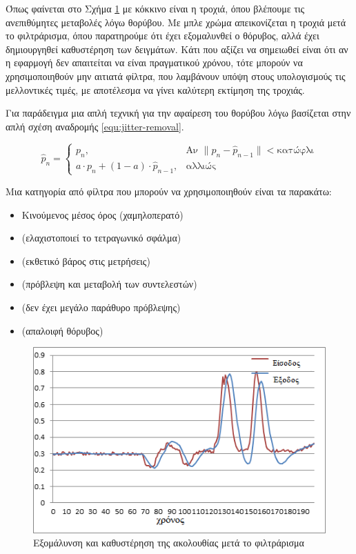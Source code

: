 Όπως φαίνεται στο Σχήμα \ref{fig:filter-latency} με κόκκινο είναι η τροχιά, όπου βλέπουμε τις ανεπιθύμητες μεταβολές λόγω θορύβου. Με μπλε χρώμα απεικονίζεται η τροχιά μετά το φιλτράρισμα, όπου παρατηρούμε ότι έχει εξομαλυνθεί ο θόρυβος, αλλά έχει δημιουργηθεί καθυστέρηση των δειγμάτων. Κάτι που αξίζει να σημειωθεί είναι ότι αν η εφαρμογή δεν απαιτείται να είναι πραγματικού χρόνου, τότε μπορούν να χρησιμοποιηθούν μην αιτιατά φίλτρα, που λαμβάνουν υπόψη στους υπολογισμούς τις μελλοντικές τιμές, με αποτέλεσμα να γίνει καλύτερη εκτίμηση της τροχιάς.

Για παράδειγμα μια απλή τεχνική για την αφαίρεση του θορύβου λόγω  βασίζεται στην απλή σχέση αναδρομής \ref{equ:jitter-removal}.

\begin{equation}
    \hat{p}_{n} =
    \begin{cases}
        p_{n}, & \text{Αν } \|p_{n} - \hat{p}_{n-1}\| < \text{κατώφλι} \\
        a \cdot p_{n} + (1-a) \cdot \hat{p}_{n-1}, & \text{αλλιώς}
    \end{cases}
    \label{equ:jitter-removal}
\end{equation}

Μια κατηγορία από φίλτρα που μπορούν να χρησιμοποιηθούν είναι τα παρακάτω:

\begin{itemize}
    \item Κινούμενος μέσος όρος (χαμηλοπερατό)
    \item {} (ελαχιστοποιεί το τετραγωνικό σφάλμα)
    \item {} (εκθετικό βάρος στις μετρήσεις)
    \item {} (πρόβλεψη και μεταβολή των συντελεστών)
    \item {} (δεν έχει μεγάλο παράθυρο πρόβλεψης)
    \item {} (απαλοιφή θόρυβος)
\end{itemize}

\begin{figure}[H]
    \centering
    \includegraphics[width=.8\textwidth, keepaspectratio]{fig/filter-latency.png}
    \caption{Εξομάλυνση και καθυστέρηση της ακολουθίας μετά το φιλτράρισμα\protect\footnotemark}
    \label{fig:filter-latency}
\end{figure}

